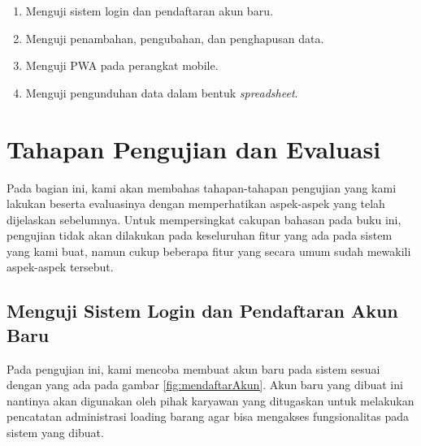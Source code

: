 \begin{enumerate}[nolistsep]

  \item Menguji sistem login dan pendaftaran akun baru.
  \vspace{0.5ex}

  \item Menguji penambahan, pengubahan, dan penghapusan data.
  \vspace{0.5ex}

  \item Menguji PWA pada perangkat mobile.
  \vspace{0.5ex}

  \item Menguji pengunduhan data dalam bentuk \emph{spreadsheet}.
  \vspace{0.5ex}

\end{enumerate}
\vspace{0.5ex}

\section{Tahapan Pengujian dan Evaluasi}
\vspace{1ex}

Pada bagian ini, kami akan membahas tahapan-tahapan pengujian yang kami lakukan beserta evaluasinya dengan memperhatikan aspek-aspek yang telah dijelaskan sebelumnya.
Untuk mempersingkat cakupan bahasan pada buku ini, pengujian tidak akan dilakukan pada keseluruhan fitur yang ada pada sistem yang kami buat, namun cukup beberapa fitur yang secara umum sudah mewakili aspek-aspek tersebut.
\vspace{0.5ex}

\subsection{Menguji Sistem Login dan Pendaftaran Akun Baru}
\vspace{1ex}

Pada pengujian ini, kami mencoba membuat akun baru pada sistem sesuai dengan yang ada pada gambar \ref{fig:mendaftarAkun}.
Akun baru yang dibuat ini nantinya akan digunakan oleh pihak karyawan yang ditugaskan untuk melakukan pencatatan administrasi loading barang agar bisa mengakses fungsionalitas pada sistem yang dibuat.
\vspace{0.5ex}

